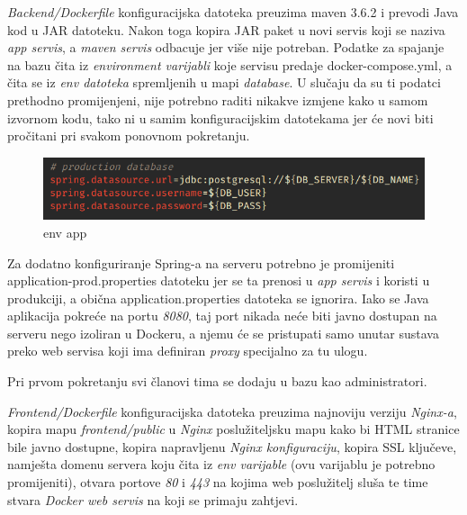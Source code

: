 				
		
		 \textit{Backend/Dockerfile} konfiguracijska datoteka preuzima maven 3.6.2 i prevodi Java kod u JAR datoteku. Nakon toga kopira JAR paket u novi servis koji se naziva  \textit{app servis}, a  \textit{maven servis} odbacuje jer više nije potreban. Podatke za spajanje na bazu čita iz  \textit{environment varijabli} koje servisu predaje docker-compose.yml, a čita se iz  \textit{env datoteka} spremljenih u mapi  \textit{database}. U slučaju da su ti podatci prethodno promijenjeni, nije potrebno raditi nikakve izmjene kako u samom izvornom kodu, tako ni u  samim konfiguracijskim datotekama jer će novi biti pročitani pri svakom ponovnom pokretanju.		
		
		\begin{figure}[H]
					\includegraphics[scale=0.8]{figures/5-env.PNG}
					\centering
					\caption{env app}
					\label{fig:env app}
				\end{figure} 
				
		Za dodatno konfiguriranje Spring-a na serveru potrebno je promijeniti application-prod.properties datoteku jer se ta prenosi u  \textit{app servis} i koristi u produkciji, a obična application.properties datoteka se ignorira. 
Iako se Java aplikacija pokreće na portu  \textit{8080}, taj port nikada neće biti javno dostupan na serveru nego izoliran u Dockeru, a njemu će se pristupati samo unutar sustava preko web servisa koji ima definiran  \textit{proxy} specijalno za tu ulogu.

		Pri prvom pokretanju svi članovi tima se dodaju u bazu kao administratori.\\
		
		
		
		 \textit{Frontend/Dockerfile}  konfiguracijska datoteka preuzima najnoviju verziju  \textit{Nginx-a}, kopira mapu  \textit{frontend/public} u  \textit{Nginx} poslužiteljsku mapu kako bi HTML stranice bile javno dostupne, kopira napravljenu  \textit{Nginx konfiguraciju}, kopira SSL ključeve, namješta domenu servera koju čita iz  \textit{env varijable} (ovu varijablu je potrebno promijeniti), otvara portove  \textit{80} i  \textit{443} na kojima web poslužitelj sluša te time stvara  \textit{Docker web servis} na koji se primaju zahtjevi.

